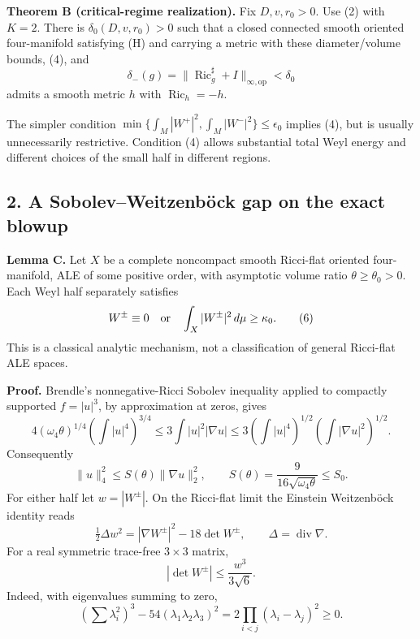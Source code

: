 \documentclass[
  11pt,
]{article}
\begin{document}
\textbf{Theorem B (critical-regime realization).} Fix \(D,v,r_0>0\). Use
(2) with \(K=2\). There is \(\delta_0(D,v,r_0)>0\) such that a closed
connected smooth oriented four-manifold satisfying (H) and carrying a
metric with these diameter/volume bounds, (4), and \[
 \delta_-(g)=\|\operatorname{Ric}^{\sharp}_g+I\|_{\infty,\mathrm{op}}
                       <\delta_0                       \tag{5}
\] admits a smooth metric \(h\) with \(\operatorname{Ric}_h=-h\).

The simpler condition
\(\min\{\int_M|W^+|^2,\int_M|W^-|^2\}\le\epsilon_0\) implies (4), but is
usually unnecessarily restrictive. Condition (4) allows substantial
total Weyl energy and different choices of the small half in different
regions.

\hypertarget{a-sobolevweitzenbuxf6ck-gap-on-the-exact-blowup}{%
\subsection{2. A Sobolev--Weitzenböck gap on the exact
blowup}\label{a-sobolevweitzenbuxf6ck-gap-on-the-exact-blowup}}

\textbf{Lemma C.} Let \(X\) be a complete noncompact smooth Ricci-flat
oriented four-manifold, ALE of some positive order, with asymptotic
volume ratio \(\theta\ge\theta_0>0\). Each Weyl half separately
satisfies \[
 W^\pm\equiv0\quad\hbox{or}\quad
                       \int_X|W^\pm|^2\,d\mu\ge\kappa_0. \tag{6}
\] This is a classical analytic mechanism, not a classification of
general Ricci-flat ALE spaces.

\textbf{Proof.} Brendle's nonnegative-Ricci Sobolev inequality applied
to compactly supported \(f=|u|^3\), by approximation at zeros, gives \[
 4(\omega_4\theta)^{1/4}
       \left(\int|u|^4\right)^{3/4}
 \le3\int|u|^2|\nabla u|
 \le3\left(\int|u|^4\right)^{1/2}
           \left(\int|\nabla u|^2\right)^{1/2}.
\] Consequently \[
 \|u\|_4^2\le S(\theta)\|\nabla u\|_2^2,\qquad
 S(\theta)=\frac9{16\sqrt{\omega_4\theta}}\le S_0.          \tag{7}
\] For either half let \(w=|W^\pm|\). On the Ricci-flat limit the
Einstein Weitzenböck identity reads \[
 \tfrac12\Delta w^2=|\nabla W^\pm|^2-18\det W^\pm,
 \qquad\Delta=\operatorname{div}\nabla.                   \tag{8}
\] For a real symmetric trace-free \(3\times3\) matrix, \[
 |\det W^\pm|\le\frac{w^3}{3\sqrt6}.                      \tag{9}
\] Indeed, with eigenvalues summing to zero, \[
 (\sum\lambda_i^2)^3-54(\lambda_1\lambda_2\lambda_3)^2
       =2\prod_{i<j}(\lambda_i-\lambda_j)^2\ge0.
\]
\end{document}

